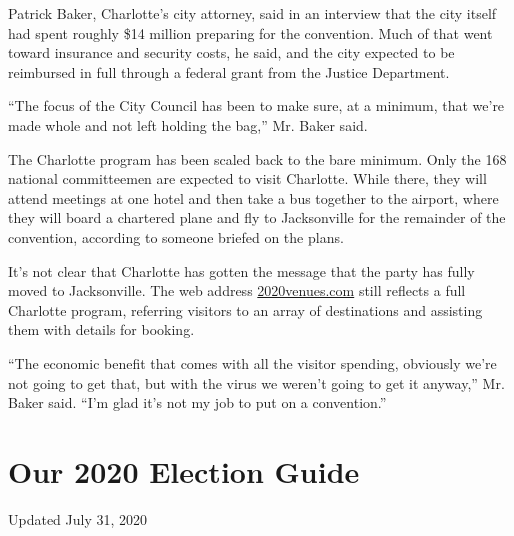 Patrick Baker, Charlotte's city attorney, said in an interview that the
city itself had spent roughly \$14 million preparing for the convention.
Much of that went toward insurance and security costs, he said, and the
city expected to be reimbursed in full through a federal grant from the
Justice Department.

``The focus of the City Council has been to make sure, at a minimum,
that we're made whole and not left holding the bag,'' Mr. Baker said.

The Charlotte program has been scaled back to the bare minimum. Only the
168 national committeemen are expected to visit Charlotte. While there,
they will attend meetings at one hotel and then take a bus together to
the airport, where they will board a chartered plane and fly to
Jacksonville for the remainder of the convention, according to someone
briefed on the plans.

It's not clear that Charlotte has gotten the message that the party has
fully moved to Jacksonville. The web address
\href{http://2020venues.com/}{2020venues.com} still reflects a full
Charlotte program, referring visitors to an array of destinations and
assisting them with details for booking.

``The economic benefit that comes with all the visitor spending,
obviously we're not going to get that, but with the virus we weren't
going to get it anyway,'' Mr. Baker said. ``I'm glad it's not my job to
put on a convention.''

\hypertarget{our-2020-election-guide}{%
\section{Our 2020 Election Guide}\label{our-2020-election-guide}}

Updated July 31, 2020

